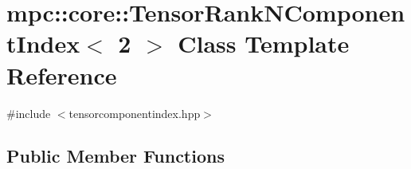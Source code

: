 \hypertarget{classmpc_1_1core_1_1_tensor_rank_n_component_index_3_012_01_4}{}\section{mpc\+:\+:core\+:\+:Tensor\+Rank\+N\+Component\+Index$<$ 2 $>$ Class Template Reference}
\label{classmpc_1_1core_1_1_tensor_rank_n_component_index_3_012_01_4}


{\ttfamily \#include $<$tensorcomponentindex.\+hpp$>$}

\subsection*{Public Member Functions}
